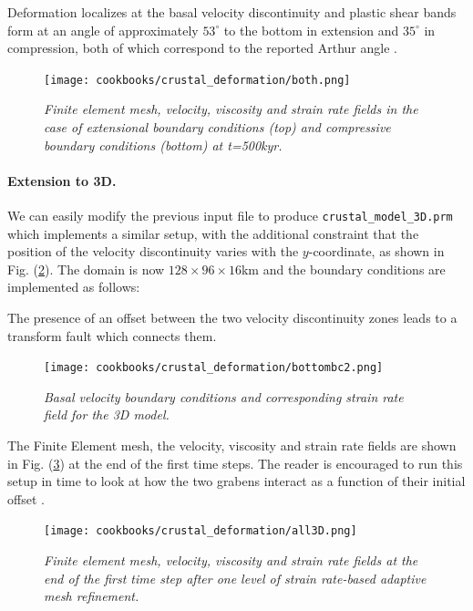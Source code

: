\documentclass{article}
\begin{document}
 

Deformation localizes at the basal velocity discontinuity and plastic shear bands
form at an angle of approximately $53^\circ$ to the bottom in extension and 
$35^\circ$ in compression, both of which correspond to the reported Arthur angle \cite{kaus10,buit12}. 

\begin{figure}
  \centering
  \texttt{[image: cookbooks/crustal\_deformation/both.png]}
  \caption{\it Finite element mesh, velocity, viscosity and strain rate fields
  in the case of extensional boundary conditions (top) and compressive boundary conditions (bottom) at t=500kyr.}
  \label{fig:extcompr}
\end{figure}



\paragraph{Extension to 3D.} We can easily modify the previous 
input file to produce {\tt crustal\_model\_3D.prm}
which implements a similar setup, with the additional constraint that the position 
of the velocity discontinuity varies with the $y$-coordinate, 
as shown in Fig. (\ref{fig:bottombc}). 
The domain is now 
$128\times96\times16$km and the boundary conditions are implemented as
follows:



The presence of 
an offset between the two velocity discontinuity zones leads to a transform 
fault which connects them. 

\begin{figure}
  \centering
  \texttt{[image: cookbooks/crustal\_deformation/bottombc2.png]}
  \caption{\it Basal velocity boundary conditions and corresponding 
  strain rate field for the 3D model.} 
  \label{fig:bottombc}
\end{figure}

The Finite Element mesh, the velocity, viscosity and strain rate fields are shown 
in Fig. (\ref{fig:ext3D}) at the end of the first time steps. The reader is encouraged
to run this setup in time to look at how the two grabens interact as a function 
of their initial offset \cite{alht11,alht12,alhf13}.

\begin{figure}
\centering
\texttt{[image: cookbooks/crustal\_deformation/all3D.png]}
\caption{\it Finite element mesh, velocity, viscosity and strain rate fields at
the end of the first time step after one level of strain rate-based adaptive mesh refinement.} 
\label{fig:ext3D}
\end{figure}
\end{document}
